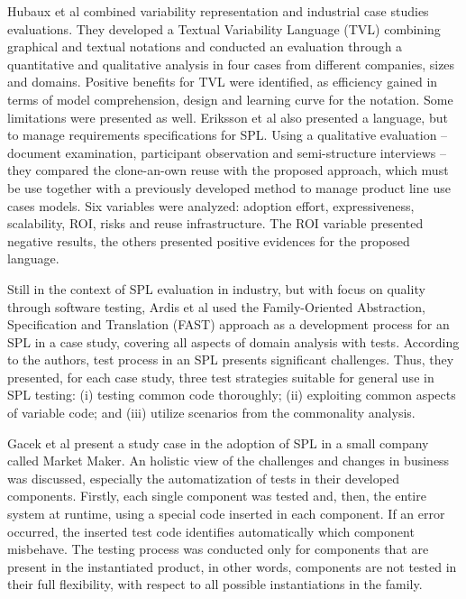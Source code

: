 Hubaux et al \cite{hubaux10} combined variability representation and industrial case studies evaluations. They developed a Textual Variability Language (TVL) combining graphical and textual notations and conducted an evaluation through a quantitative and qualitative analysis in four cases from different companies, sizes and domains. Positive benefits for TVL were identified, as efficiency gained in terms of model comprehension, design and learning curve for the notation. Some limitations were presented as well. Eriksson et al \cite{eriksson09} also presented a language, but to manage requirements specifications for SPL. Using a qualitative evaluation -- document examination, participant observation and semi-structure interviews -- they compared the clone-an-own reuse with the proposed approach, which must be use together with a previously developed method to manage product line use cases models. Six variables were analyzed: adoption effort, expressiveness, scalability, ROI, risks and reuse infrastructure. The ROI variable presented negative results, the others presented positive evidences for the proposed language. 

Still in the context of SPL evaluation in industry, but with focus on quality through software testing, Ardis et al \cite{ardis00} used the Family-Oriented Abstraction, Specification and Translation (FAST) approach as a development process for an SPL in a case study, covering all aspects of domain analysis with tests. According to the authors, test process in an SPL presents significant challenges. Thus, they presented, for each case study, three test strategies suitable for general use in SPL testing: (i) testing common code thoroughly; (ii) exploiting common aspects of variable code; and (iii) utilize scenarios from the commonality analysis. 

Gacek et al \cite{gacek01} present a study case in the adoption of SPL in a small company called Market Maker. An holistic view of the challenges and changes in business was discussed, especially the automatization of tests in their developed components. Firstly, each single component was tested and, then, the entire system at runtime, using a special code inserted in each component. If an error occurred, the inserted test code identifies automatically which component misbehave. The testing process was conducted only for components that are present in the instantiated product, in other words, components are not tested in their full flexibility, with respect to all possible instantiations in the family.

